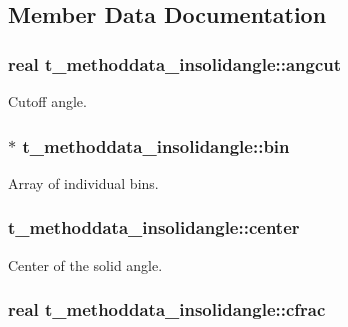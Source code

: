 \subsection{\-Member \-Data \-Documentation}
\hypertarget{structt__methoddata__insolidangle_a3719abb1ecb6c567fe408df3df588c83}{
\subsubsection[{angcut}]{\setlength{\rightskip}{0pt plus 5cm}real {\bf t\-\_\-methoddata\-\_\-insolidangle\-::angcut}}}\label{structt__methoddata__insolidangle_a3719abb1ecb6c567fe408df3df588c83}
\-Cutoff angle. \hypertarget{structt__methoddata__insolidangle_a45afb1e22a4c5ac2c79100657d6fffa2}{
\subsubsection[{bin}]{$\ast$ {\bf t\-\_\-methoddata\-\_\-insolidangle\-::bin}}}\label{structt__methoddata__insolidangle_a45afb1e22a4c5ac2c79100657d6fffa2}
\-Array of individual bins. \hypertarget{structt__methoddata__insolidangle_a6539e42606add2a09beb64be51c783eb}{
\subsubsection[{center}]{ {\bf t\-\_\-methoddata\-\_\-insolidangle\-::center}}}\label{structt__methoddata__insolidangle_a6539e42606add2a09beb64be51c783eb}
\-Center of the solid angle. \hypertarget{structt__methoddata__insolidangle_a6e8a60cab6402f9a075a5a1adb1a279d}{
\subsubsection[{cfrac}]{\setlength{\rightskip}{0pt plus 5cm}real {\bf t\-\_\-methoddata\-\_\-insolidangle\-::cfrac}}}\label{structt__methoddata__insolidangle_a6e8a60cab6402f9a075a5a1adb1a279d}
